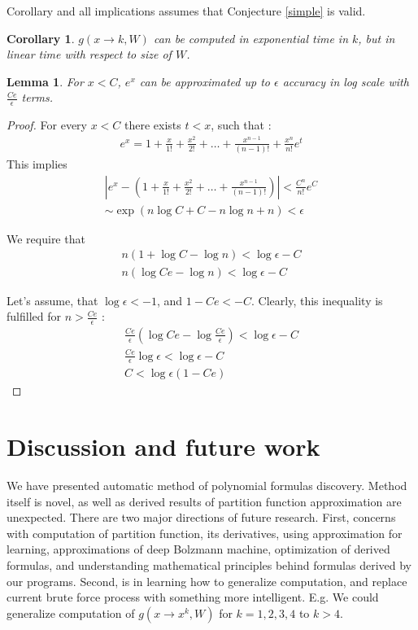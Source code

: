 \documentclass{article}
\newtheorem{lemma}[theorem]{Lemma}
\newtheorem{corollary}[theorem]{Corollary}
\begin{document}
Corollary and all implications assumes that Conjecture \ref{simple} is valid.

\begin{corollary}
	$g(x \rightarrow k, W)$
	can be computed in exponential time in $k$, but in linear time with respect to size of $W$.
\end{corollary}

\begin{lemma}
	For $x < C$, $e^x$ can be approximated up to $\epsilon$ accuracy in log scale with $\frac{Ce}{\epsilon}$ terms. 
\end{lemma}
\begin{proof}

For every $x < C$ there exists $t < x$, such that :  
\begin{align*}
	e^x = 1 + \frac{x}{1!} + \frac{x^2}{2!} + \dots + \frac{x^{n - 1}}{(n - 1)!} + \frac{x^n}{n!}e^t
\end{align*}
This implies
\begin{align*}
	|e^x - (1 + \frac{x}{1!} + \frac{x^2}{2!} + \dots + \frac{x^{n - 1}}{(n - 1)!}) | < \frac{C^n}{n!}e^C \\
	\sim \exp(n\log{C} + C - n\log{n} + n) < \epsilon
\end{align*}

We require that 
\begin{align*}
	n (1 + \log{C} - \log{n}) < \log{\epsilon} - C \\ 
	n (\log{Ce} - \log{n}) < \log{\epsilon} - C
\end{align*}

Let's assume, that $\log{\epsilon} < -1$, and $1 - Ce < -C$. 
Clearly, this inequality is fulfilled for $n > \frac{Ce}{\epsilon}$ :
\begin{align*}
	\frac{Ce}{\epsilon} (\log{Ce} - \log{\frac{Ce}{\epsilon}}) < \log{\epsilon} - C \\
	\frac{Ce}{\epsilon} \log{\epsilon} < \log{\epsilon} - C\\
	C < \log{\epsilon}(1 - Ce)
\end{align*}


\end{proof}


\section{Discussion and future work}
We have presented automatic method of polynomial formulas discovery. Method itself is novel, as well 
as derived results of partition function approximation are unexpected.
There are two major directions of future research. First, concerns with computation of partition function,
its derivatives, using approximation for learning, 
approximations of deep Bolzmann machine, optimization of derived formulas, and 
understanding mathematical principles behind formulas derived by our programs. Second, is in 
learning how to generalize computation, and replace current brute force process with something more
intelligent. E.g. We could generalize computation of $g(x \rightarrow x^k, W)$ for $k = 1, 2, 3, 4$ to
$k > 4$. 


\nocite{*}


\end{document}
